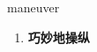 
\begin{frame}
{\huge maneuver}
\begin{center}
\begin{enumerate}\Large
  \item \textbf{巧妙地操纵}
\end{enumerate}
\end{center}
\end{frame}
